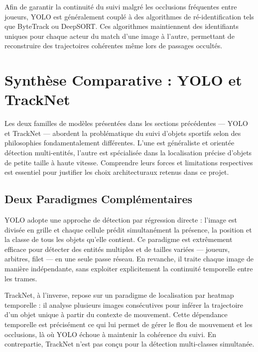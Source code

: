 \begin{itemize}
Afin de garantir la continuité du suivi malgré les occlusions fréquentes entre
joueurs, YOLO est généralement couplé à des algorithmes de ré-identification tels
que ByteTrack ou DeepSORT. Ces algorithmes maintiennent des identifiants uniques
pour chaque acteur du match d'une image à l'autre, permettant de reconstruire des
trajectoires cohérentes même lors de passages occultés.

\section{Synthèse Comparative : YOLO et TrackNet}

Les deux familles de modèles présentées dans les sections précédentes — YOLO et
TrackNet — abordent la problématique du suivi d'objets sportifs selon des philosophies
fondamentalement différentes. L'une est généraliste et orientée détection multi-entités,
l'autre est spécialisée dans la localisation précise d'objets de petite taille à haute
vitesse. Comprendre leurs forces et limitations respectives est essentiel pour justifier
les choix architecturaux retenus dans ce projet.

\subsection{Deux Paradigmes Complémentaires}

YOLO adopte une approche de détection par régression directe : l'image est divisée en
grille et chaque cellule prédit simultanément la présence, la position et la classe de
tous les objets qu'elle contient. Ce paradigme est extrêmement efficace pour détecter
des entités multiples et de tailles variées — joueurs, arbitres, filet — en une seule
passe réseau. En revanche, il traite chaque image de manière indépendante, sans
exploiter explicitement la continuité temporelle entre les trames.

TrackNet, à l'inverse, repose sur un paradigme de localisation par heatmap
temporelle : il analyse plusieurs images consécutives pour inférer la trajectoire d'un
objet unique à partir du contexte de mouvement. Cette dépendance temporelle est
précisément ce qui lui permet de gérer le flou de mouvement et les occlusions, là où
YOLO échoue à maintenir la cohérence du suivi. En contrepartie, TrackNet n'est pas
conçu pour la détection multi-classes simultanée.


\end{itemize}
